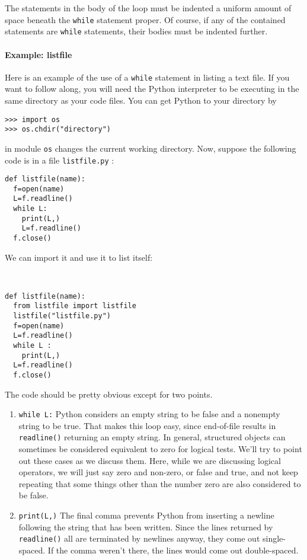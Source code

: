 The statements in the body of the
loop must be indented a uniform amount of space beneath the \texttt{while}
statement proper. Of course, if any of the contained statements are
\texttt{while} statements, their bodies must be indented further.

\paragraph{Example: listfile}
\label{example-listfile}

Here is an example of the use of a
\texttt{while} statement in listing a text file. If you want to follow
along, you will need the Python interpreter to be executing in the same
directory as your code files. You can get Python to your directory by

\begin{verbatim}
>>> import os
>>> os.chdir("directory")
\end{verbatim}

 in
module \texttt{os} changes the current working directory. Now, suppose the
following code is in a file \texttt{listfile.py} :

\begin{verbatim}
def listfile(name):
  f=open(name)
  L=f.readline()
  while L:
    print(L,)
    L=f.readline()
  f.close()
\end{verbatim}

We can import it and use it to list
itself:


\begin{verbatim}


def listfile(name):
  from listfile import listfile
  listfile("listfile.py")
  f=open(name)
  L=f.readline()
  while L :
    print(L,)
  L=f.readline()
  f.close()
\end{verbatim}

The code should be pretty obvious
except for two points.

\begin{enumerate}

\item
  \texttt{while L:} Python considers an empty string to be false and a nonempty string to be
  true. That makes this loop easy, since end-of-file results in
  \texttt{readline()} returning an empty string. In general, structured
  objects can sometimes be considered equivalent to zero for logical
  tests. We'll try to point out these cases as we discuss them. Here,
  while we are discussing logical operators, we will just say zero and
  non-zero, or false and true, and not keep repeating that some things
  other than the number zero are also considered to be false.
\item
  \texttt{print(L,)} The final comma
  prevents Python from inserting a newline following the string that has
  been written. Since the lines returned by \texttt{readline()} all are
  terminated by newlines anyway, they come out single-spaced. If the
  comma weren't there, the lines would come out double-spaced.
\end{enumerate}

